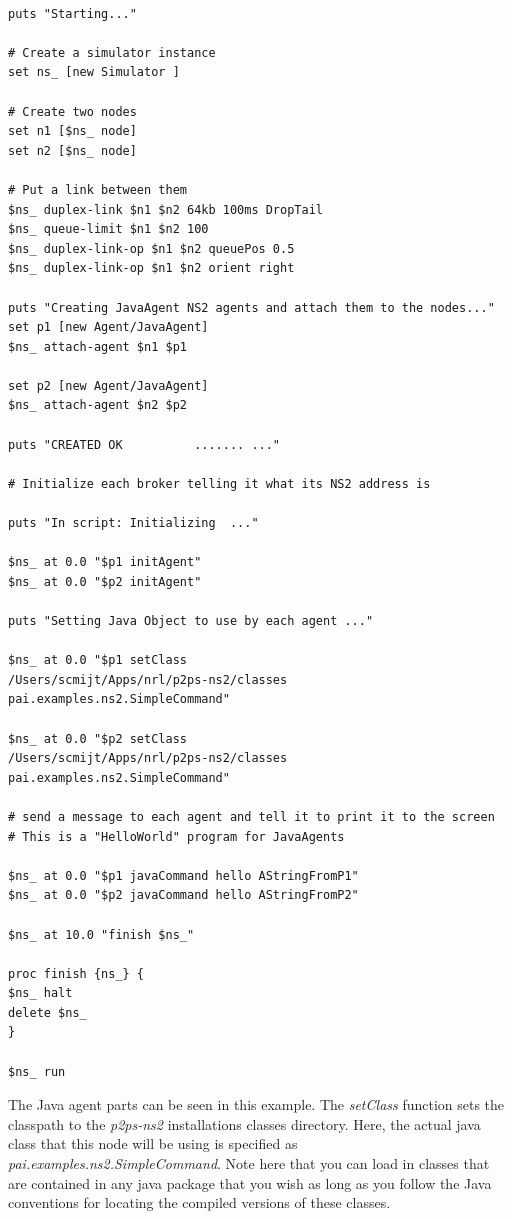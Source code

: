 \footnotesize
\begin{verbatim}

puts "Starting..."   

# Create a simulator instance
set ns_ [new Simulator ]

# Create two nodes
set n1 [$ns_ node]
set n2 [$ns_ node]

# Put a link between them
$ns_ duplex-link $n1 $n2 64kb 100ms DropTail
$ns_ queue-limit $n1 $n2 100
$ns_ duplex-link-op $n1 $n2 queuePos 0.5
$ns_ duplex-link-op $n1 $n2 orient right

puts "Creating JavaAgent NS2 agents and attach them to the nodes..."   
set p1 [new Agent/JavaAgent]
$ns_ attach-agent $n1 $p1

set p2 [new Agent/JavaAgent]
$ns_ attach-agent $n2 $p2

puts "CREATED OK          ....... ..." 
    
# Initialize each broker telling it what its NS2 address is

puts "In script: Initializing  ..." 
	
$ns_ at 0.0 "$p1 initAgent"
$ns_ at 0.0 "$p2 initAgent"

puts "Setting Java Object to use by each agent ..." 

$ns_ at 0.0 "$p1 setClass 
/Users/scmijt/Apps/nrl/p2ps-ns2/classes pai.examples.ns2.SimpleCommand"

$ns_ at 0.0 "$p2 setClass 
/Users/scmijt/Apps/nrl/p2ps-ns2/classes pai.examples.ns2.SimpleCommand"

# send a message to each agent and tell it to print it to the screen
# This is a "HelloWorld" program for JavaAgents

$ns_ at 0.0 "$p1 javaCommand hello AStringFromP1" 
$ns_ at 0.0 "$p2 javaCommand hello AStringFromP2" 

$ns_ at 10.0 "finish $ns_"

proc finish {ns_} {
$ns_ halt
delete $ns_
}

$ns_ run
\end{verbatim}
\normalsize

The Java agent parts can be seen in this example.  The \emph{setClass}
function sets the classpath to the \emph{p2ps-ns2} installations classes 
directory.  Here, the actual java class that this node will be using is 
specified as \emph{pai.examples.ns2.SimpleCommand}.  Note 
here that you can load  in classes that are contained in any 
java package that you wish as long as you follow the Java 
conventions for locating the compiled versions of these classes.

